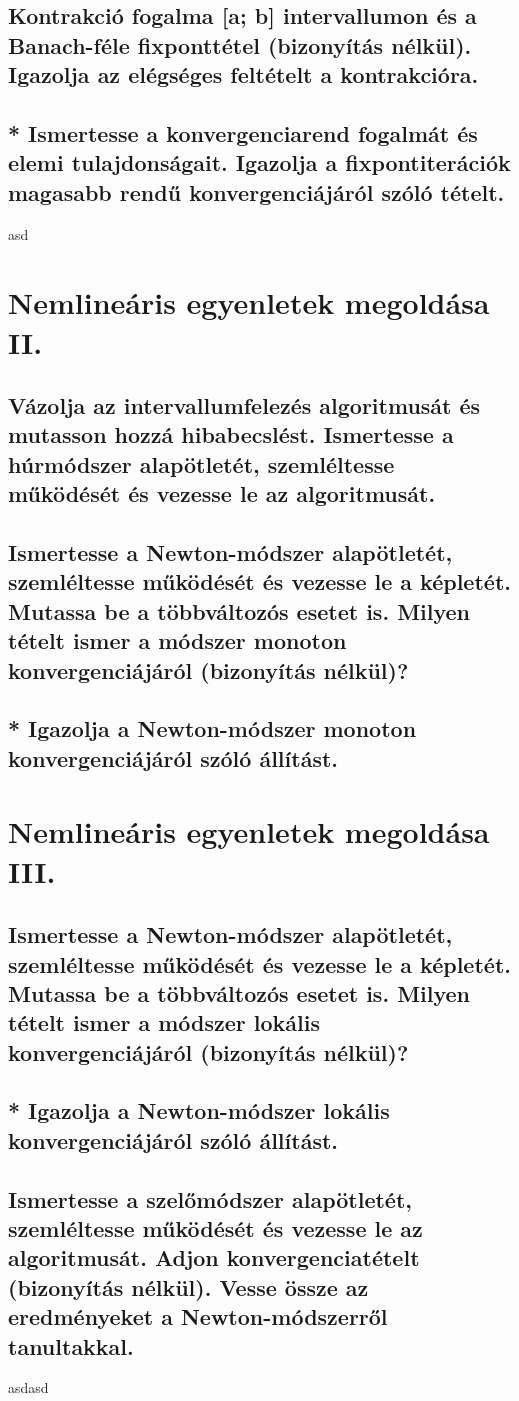 \documentclass{article}
\begin{document}
        \subsection{Kontrakció fogalma [a; b] intervallumon és a Banach-féle fixponttétel (bizonyítás nélkül). Igazolja az elégséges feltételt a kontrakcióra.}
        \subsection{* Ismertesse a konvergenciarend fogalmát és elemi tulajdonságait. Igazolja a fixpontiterációk magasabb rendű konvergenciájáról szóló tételt.}

asd
    \section{Nemlineáris egyenletek megoldása II.}
        \subsection{Vázolja az intervallumfelezés algoritmusát és mutasson hozzá hibabecslést. Ismertesse a húrmódszer alapötletét, szemléltesse működését és vezesse le az algoritmusát.}
        \subsection{Ismertesse a Newton-módszer alapötletét, szemléltesse működését és vezesse le a képletét. Mutassa be a többváltozós esetet is. Milyen tételt ismer a módszer monoton konvergenciájáról (bizonyítás nélkül)?}
        \subsection{* Igazolja a Newton-módszer monoton konvergenciájáról szóló állítást.}


    \section{Nemlineáris egyenletek megoldása III.}
        \subsection{Ismertesse a Newton-módszer alapötletét, szemléltesse működését és vezesse le a képletét. Mutassa be a többváltozós esetet is. Milyen tételt ismer a módszer lokális konvergenciájáról (bizonyítás nélkül)?}
        \subsection{* Igazolja a Newton-módszer lokális konvergenciájáról szóló állítást.}
        \subsection{Ismertesse a szelőmódszer alapötletét, szemléltesse működését és vezesse le az algoritmusát. Adjon konvergenciatételt (bizonyítás nélkül). Vesse össze az eredményeket a Newton-módszerről tanultakkal.}
    
        asdasd
\end{document}
